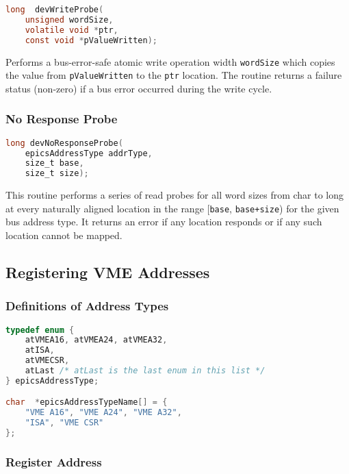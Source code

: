 \begin{lstlisting}[language=C]
long  devWriteProbe(
    unsigned wordSize,
    volatile void *ptr,
    const void *pValueWritten);
\end{lstlisting}

Performs a bus-error-safe atomic write operation width \verb|wordSize| which copies the value from \verb|pValueWritten| to the 
\verb|ptr| location. The routine returns a failure status (non-zero) if a bus error occurred during the write cycle.

\subsubsection{No Response Probe}

\begin{lstlisting}[language=C]
long devNoResponseProbe(
    epicsAddressType addrType,
    size_t base,
    size_t size);
\end{lstlisting}

This routine performs a series of read probes for all word sizes from char to long at every naturally aligned location in the 
range [\verb|base|, \verb|base+size|) for the given bus address type. It returns an error if any location responds or if any such 
location cannot be mapped.

\subsection{Registering VME Addresses}

\subsubsection{Definitions of Address Types}

\begin{lstlisting}[language=C]
typedef enum {
    atVMEA16, atVMEA24, atVMEA32,
    atISA,
    atVMECSR,
    atLast /* atLast is the last enum in this list */
} epicsAddressType;

char  *epicsAddressTypeName[] = {
    "VME A16", "VME A24", "VME A32",
    "ISA", "VME CSR"
};
\end{lstlisting}

\subsubsection{Register Address}


